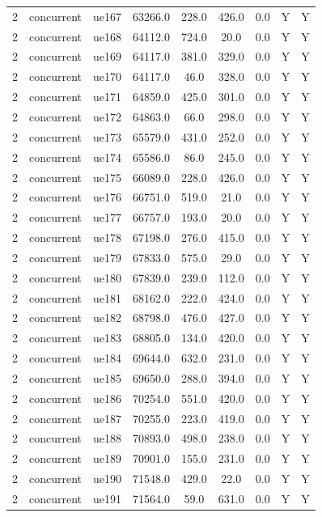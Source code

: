 \begin{table}[ht]
\begin{tabular}{|c|c|c|c|c|c|c|c|c|}
2 & concurrent & ue167 & 63266.0 & 228.0 & 426.0 & 0.0 & Y & Y \\
2 & concurrent & ue168 & 64112.0 & 724.0 & 20.0 & 0.0 & Y & Y \\
2 & concurrent & ue169 & 64117.0 & 381.0 & 329.0 & 0.0 & Y & Y \\
2 & concurrent & ue170 & 64117.0 & 46.0 & 328.0 & 0.0 & Y & Y \\
2 & concurrent & ue171 & 64859.0 & 425.0 & 301.0 & 0.0 & Y & Y \\
2 & concurrent & ue172 & 64863.0 & 66.0 & 298.0 & 0.0 & Y & Y \\
2 & concurrent & ue173 & 65579.0 & 431.0 & 252.0 & 0.0 & Y & Y \\
2 & concurrent & ue174 & 65586.0 & 86.0 & 245.0 & 0.0 & Y & Y \\
2 & concurrent & ue175 & 66089.0 & 228.0 & 426.0 & 0.0 & Y & Y \\
2 & concurrent & ue176 & 66751.0 & 519.0 & 21.0 & 0.0 & Y & Y \\
2 & concurrent & ue177 & 66757.0 & 193.0 & 20.0 & 0.0 & Y & Y \\
2 & concurrent & ue178 & 67198.0 & 276.0 & 415.0 & 0.0 & Y & Y \\
2 & concurrent & ue179 & 67833.0 & 575.0 & 29.0 & 0.0 & Y & Y \\
2 & concurrent & ue180 & 67839.0 & 239.0 & 112.0 & 0.0 & Y & Y \\
2 & concurrent & ue181 & 68162.0 & 222.0 & 424.0 & 0.0 & Y & Y \\
2 & concurrent & ue182 & 68798.0 & 476.0 & 427.0 & 0.0 & Y & Y \\
2 & concurrent & ue183 & 68805.0 & 134.0 & 420.0 & 0.0 & Y & Y \\
2 & concurrent & ue184 & 69644.0 & 632.0 & 231.0 & 0.0 & Y & Y \\
2 & concurrent & ue185 & 69650.0 & 288.0 & 394.0 & 0.0 & Y & Y \\
2 & concurrent & ue186 & 70254.0 & 551.0 & 420.0 & 0.0 & Y & Y \\
2 & concurrent & ue187 & 70255.0 & 223.0 & 419.0 & 0.0 & Y & Y \\
2 & concurrent & ue188 & 70893.0 & 498.0 & 238.0 & 0.0 & Y & Y \\
2 & concurrent & ue189 & 70901.0 & 155.0 & 231.0 & 0.0 & Y & Y \\
2 & concurrent & ue190 & 71548.0 & 429.0 & 22.0 & 0.0 & Y & Y \\
2 & concurrent & ue191 & 71564.0 & 59.0 & 631.0 & 0.0 & Y & Y \\

\end{tabular}
\end{table}

